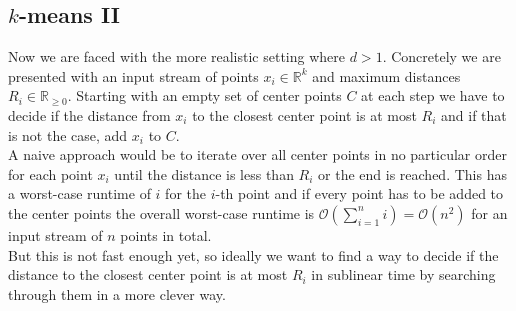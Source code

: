 \documentclass[a4paper,12pt,headsepline]{scrartcl}
\begin{document}
    
    \subsection{$k$-means II}
    Now we are faced with the more realistic setting where $d > 1$. Concretely 
    we are presented with an input stream of points $x_i \in \mathbb R^k$ and
    maximum distances $R_i \in \mathbb R_{\geq 0}$. Starting with an empty set of
    center points $C$ at each step we have to decide if the distance from $x_i$ to the closest
    center point is at most $R_i$ and if that is not the case, add $x_i$ to $C$.\\
    A naive approach would be to iterate over all center points in no particular order 
    for each point $x_i$ until the distance is less than $R_i$ or the end is reached. This has 
    a worst-case runtime of $i$ for the $i$-th point and if every point has to 
    be added to the center points the overall worst-case runtime is $\mathcal O(\sum_{i=1}^ni) = \mathcal O(n^2)$
    for an input stream of $n$ points in total.\\
    But this is not fast enough yet, so ideally we want to find a way to decide if the distance
    to the closest center point is at most $R_i$ in sublinear time by searching through
    them in a more clever way.
\end{document}
